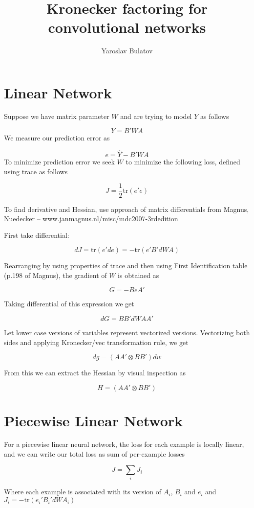 \documentclass{article}
\begin{document}
\title{Kronecker factoring for convolutional networks}
\author{Yaroslav Bulatov}

\maketitle
\section*{Linear Network}
Suppose we have matrix parameter $W$ and are trying to model $Y$ as follows

$$Y = B'W A$$
We measure our prediction error as

$$e = \hat{Y}-B'WA$$
To minimize prediction error we seek $W$ to minimize the following loss, defined using trace as follows

$$J = \frac{1}{2}\text{tr}(e'e)$$

To find derivative and Hessian, use approach of matrix differentials from Magnus, Nuedecker -- www.janmagnus.nl/misc/mdc2007-3rdedition

First take differential:

$$dJ = \text{tr}(e'de) = -\text{tr}(e'B'dWA)$$

Rearranging by using properties of trace and then using First Identification table (p.198 of Magnus), the gradient of $W$ is obtained as

$$G=-BeA'$$

Taking differential of this expression we get

$$dG = BB'dW AA'$$

Let lower case versions of variables represent vectorized versions. Vectorizing both sides and applying Kronecker/vec transformation rule, we get

$$dg = (AA'\otimes BB')dw$$

From this we can extract the Hessian by visual inspection as

$$H = (AA'\otimes BB')$$

\section*{Piecewise Linear Network}
For a piecewise linear neural network, the loss for each example is locally linear, and we can write our total loss as sum of per-example losses

$$J = \sum_i J_i$$

Where each example is associated with its version of $A_i$, $B_i$ and $e_i$ and $J_i = -\text{tr}(e_i'B_i'dWA_i)$
\end{document}
